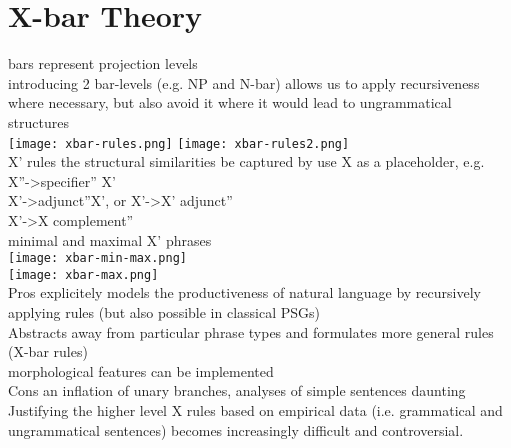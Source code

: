 \section{X-bar Theory}
{\tiny bars represent projection levels}\\
{\tiny introducing 2 bar-levels (e.g. NP and N-bar) allows us to apply recursiveness where necessary, but also avoid it where it would lead to ungrammatical structures}\\
\texttt{[image: xbar-rules.png]}
\texttt{[image: xbar-rules2.png]}\\
\scriptsize{X' rules} {\tiny the structural similarities be captured by use X as a placeholder, e.g. \\
X''->specifier'' X'\\
X'->adjunct''X', or X'->X' adjunct''\\
X'->X complement''}\\
\scriptsize{minimal and maximal X' phrases}\\\texttt{[image: xbar-min-max.png]}\\
\texttt{[image: xbar-max.png]}\\
\scriptsize{Pros} 
{\tiny explicitely models the productiveness of natural language by recursively applying rules (but also possible in classical PSGs)\\
Abstracts away from particular phrase types and formulates more general rules (X-bar rules)\\
morphological features can be implemented}\\
\scriptsize{Cons} 
{\tiny an inflation of unary branches, analyses of simple sentences daunting\\
Justifying the higher level X rules based on empirical data (i.e. grammatical and ungrammatical sentences) becomes increasingly difficult and controversial.}